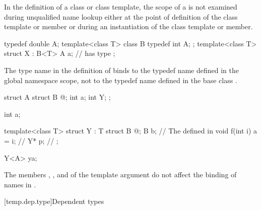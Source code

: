 \pnum
In the definition of a class or class template,
the scope of a 
is not examined during unqualified
name lookup either at the point of definition of the
class template or member or during an instantiation of
the class template or member.
\begin{example}
\begin{codeblock}
typedef double A;
template<class T> class B {
  typedef int A;
};
template<class T> struct X : B<T> {
  A a;              //  has type 
};
\end{codeblock}

The type name
in the definition of
binds to the typedef name defined in the global
namespace scope, not to the typedef name
defined in the base class
.
\end{example}
\begin{example}
\begin{codeblock}
struct A {
  struct B { @\commentellip@ };
  int a;
  int Y;
};

int a;

template<class T> struct Y : T {
  struct B { @\commentellip@ };
  B b;                          // The  defined in 
  void f(int i) { a = i; }      // 
  Y* p;                         // 
};

Y<A> ya;
\end{codeblock}

The members
,
,
and
of the template argument
do not affect the binding of names in
.
\end{example}

[temp.dep.type]{Dependent types}

